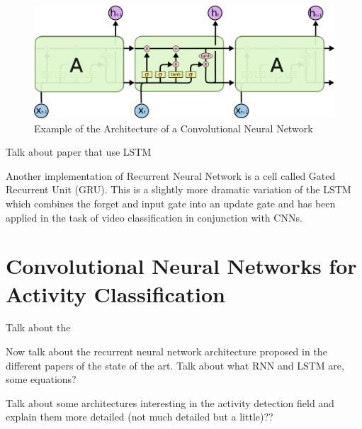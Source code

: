 \begin{figure}[ht]
\begin{center}
\includegraphics[width=0.8\linewidth]{img/stateofart/lstm_chain}
\end{center}
\caption{Example of the Architecture of a Convolutional Neural Network}
\label{fig:lstm_chain}
\end{figure}

Talk about paper that use LSTM

Another implementation of Recurrent Neural Network is a cell called Gated Recurrent Unit (GRU)\cite{cho2014learning}. This is a slightly more dramatic variation of the LSTM which combines the forget and input gate into an update gate and has been applied in the task of video classification\cite{ballas2015delving} in conjunction with CNNs.

\section{Convolutional Neural Networks for Activity Classification}

Talk about the 

Now talk about the recurrent neural network architecture proposed in the different papers of the state of the art. Talk about what RNN and LSTM are, some equations?


Talk about some architectures interesting in the activity detection field and explain them more detailed (not much detailed but a little)??



